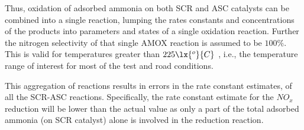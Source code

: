 Thus, oxidation of adsorbed ammonia on both SCR and ASC catalysts can be  combined into a single reaction, lumping the
rates constants and concentrations of the products into parameters and states of a single oxidation reaction. Further
the nitrogen selectivity of that single AMOX reaction is assumed to be $100\%$. This is valid for temperatures greater
than $225 \lx{^o}{C}$ \cite{jain2023diagnostics}, i.e., the temperature range of interest for most of the test and road
conditions.

This aggregation of reactions results in errors in the rate constant estimates, of all the SCR-ASC reactions.
Specifically, the rate constant estimate for the $NO_x$ reduction will be lower than the actual value as only a part of
the total adsorbed ammonia (on SCR catalyst) alone is involved in the reduction reaction.
